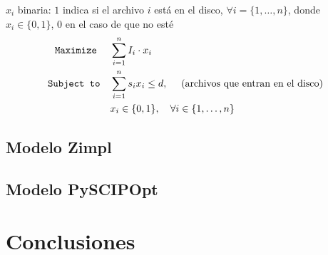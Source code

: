 \documentclass[11pt, a4paper, pdftex]{article}
\begin{document}
$x_{i}$ binaria: $1$ indica si el archivo $i$ está en el disco, $\forall i = \{1, \ldots, n\}$, donde $x_{i} \in \{0, 1\}$, $0$ en el caso de que no esté\\

\begin{alignat*}{2}
	\texttt{Maximize}\quad\,\,
	& \sum_{i = 1}^{n} I_{i} \cdot x_{i}\\
	\texttt{Subject to}\quad
	& \sum_{i = 1}^{n} s_{i} x_{i} \le d,\ \quad\text{(archivos que entran en el disco)}\\
	& x_{i} \in \{0,1\}, \quad \forall i \in \{1, \ldots, n\}
\end{alignat*}

\newpage
\subsection{Modelo Zimpl}



\newpage
\subsection{Modelo PySCIPOpt}

%

%

%

%




\section{Conclusiones}
\end{document}
